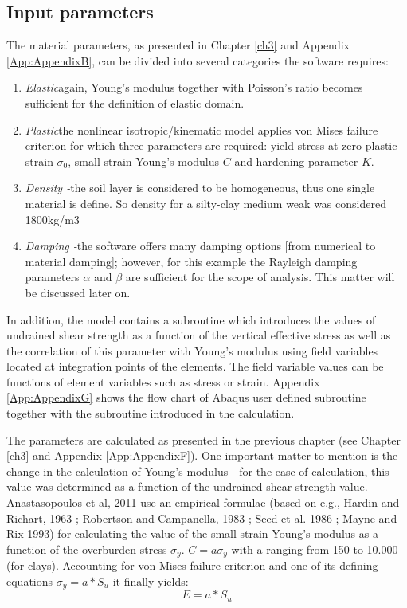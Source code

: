	\subsection{Input parameters}
	The material parameters, as presented in Chapter \ref{ch3} and Appendix \ref{App:AppendixB}, can be divided into several categories the software requires:
	\begin{enumerate}
		\item \textit{Elastic}\quad again, Young's modulus together with Poisson's ratio becomes sufficient for the definition of elastic domain.
		\item \textit{Plastic}\quad the nonlinear isotropic/kinematic model applies von Mises failure criterion for which three parameters are required: yield stress at zero plastic strain $\sigma_0$, small-strain Young's modulus $C$ and hardening parameter $K$.
		\item\textit{Density -}\quad the soil layer is considered to be homogeneous, thus one single material is define. So density for a silty-clay medium weak was considered 1800kg/m3
		\item \textit{Damping -}\quad the software offers many damping options [from numerical to material damping]; however, for this example the Rayleigh damping parameters $\alpha$ and $\beta$ are sufficient for the scope of analysis. This matter will be discussed later on.
	\end{enumerate}
	
	In addition, the model contains a subroutine which introduces the values of undrained shear strength as a function of the vertical effective stress as well as the correlation of this parameter with Young's modulus using field variables located at integration points of the elements. The field variable values can be functions of element variables such as stress or strain. Appendix \ref{App:AppendixG} shows the flow chart of Abaqus user defined subroutine together with the subroutine introduced in the calculation.
	
	The parameters are calculated as presented in the previous chapter (see Chapter \ref{ch3} and Appendix \ref{App:AppendixF}). One important matter to mention is the change in the calculation of Young's modulus - for the ease of calculation, this value was determined as a function of the undrained shear strength value. Anastasopoulos et al, 2011 \cite{anastasopoulos2011simplified} use an empirical formulae (based on e.g., Hardin and Richart, 1963 \cite{hardin1963elastic}; Robertson and Campanella, 1983 \cite{robertson1983interpretation}; Seed et al. 1986 \cite{seed1986use}; Mayne and Rix 1993) for calculating the value of the small-strain Young's modulus as a function of the overburden stress $\sigma_y$. $C=a{\sigma }_{y}$ with a ranging from 150 to 10.000 (for clays). Accounting for von Mises failure criterion and one of its defining equations ${\sigma}_{y}=a*S_u$ it finally yields:
	\begin{equation}
	E=a*S_u
	\end{equation}
	
